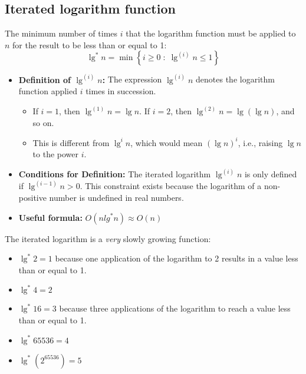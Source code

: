     \subsection{Iterated logarithm function}
        \begin{definition}
            The minimum number of times \( i \) that the logarithm function must be applied to \( n \) for the result to be less than or equal to 1:
            \begin{equation}
                \lg^{*} n = \min \left\{ i \geq 0 \; : \; \lg^{(i)} n \leq 1 \right\}
            \end{equation}
        \end{definition}
        \begin{intuition}
            \begin{itemize}
                \item \textbf{Definition of \( \lg^{(i)} n \):} The expression \( \lg^{(i)} n \) denotes the logarithm function applied \( i \) times in succession. 
                \begin{itemize}
                    \item If \( i = 1 \), then \( \lg^{(1)} n = \lg n \). If \( i = 2 \), then \( \lg^{(2)} n = \lg(\lg n) \), and so on. 
                    \item This is different from \( \lg^i n \), which would mean \( (\lg n)^i \), i.e., raising \( \lg n \) to the power \( i \). 
                \end{itemize}

                \item \textbf{Conditions for Definition:} The iterated logarithm \( \lg^{(i)} n \) is only defined if \( \lg^{(i-1)} n > 0 \). This constraint exists because the logarithm of a non-positive number is undefined in real numbers. 
                \item \textbf{Useful formula:} $O(nlg^* n) \approx O(n)$
             \end{itemize}
        \end{intuition}
        \begin{example}
            The iterated logarithm is a \emph{very} slowly growing function:

            \begin{itemize}
                \item \(\lg^{*} 2 = 1\) because one application of the logarithm to 2 results in a value less than or equal to 1.
                \item \(\lg^{*} 4 = 2\)
                \item \(\lg^{*} 16 = 3\) because three applications of the logarithm to reach a value less than or equal to 1.
                \item \(\lg^{*} 65536 = 4\)
                \item \(\lg^{*} (2^{65536}) = 5\)
            \end{itemize}
        \end{example}

